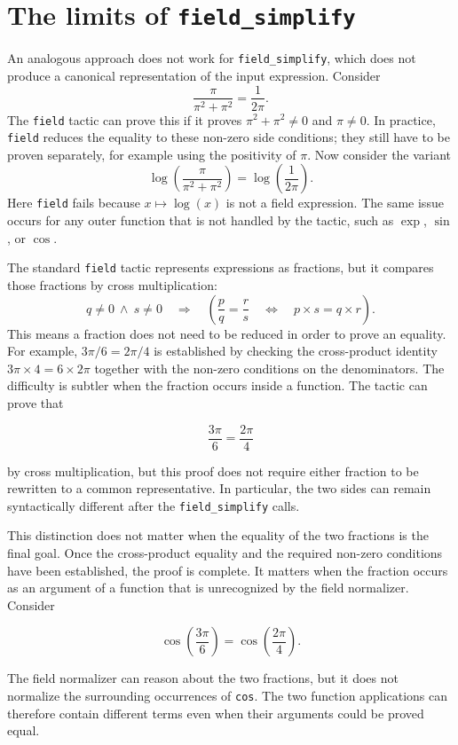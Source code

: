 \documentclass{jflart}
\begin{document}
\section{The limits of \texttt{field\_simplify}}
An analogous approach does not work for \texttt{field\_simplify}, which does not produce a canonical representation of the input expression. 
Consider
\[
  \frac{\pi}{\pi^2+\pi^2}=\frac{1}{2\pi}.
\]
The \texttt{field} tactic can prove this if it proves $\pi^2+\pi^2\ne0$ and
$\pi\ne0$.
In practice, \texttt{field} reduces the equality to these non-zero side conditions; they still have to be proven separately, for example using the positivity of
$\pi$.
Now consider the variant
\[
  \log\!\left(\frac{\pi}{\pi^2+\pi^2}\right)
  = \log\!\left(\frac{1}{2\pi}\right).
\]
Here \texttt{field} fails because $x\mapsto\log(x)$ is not a field
expression. The same issue occurs for any outer function that is not handled by the tactic, such as $\exp$, $\sin$, or $\cos$.


The standard \texttt{field} tactic represents expressions as fractions, but it compares those fractions by cross multiplication:
\[
  q\ne0\ \land\ s\ne0
  \quad\Longrightarrow\quad
  \left(\frac{p}{q}=\frac{r}{s}
  \quad\Longleftrightarrow\quad
  p\times s=q\times r\right).
\]
This means a fraction does not need to be reduced in order to prove an equality.
For example, $3\pi/6=2\pi/4$ is established by checking the cross-product
identity $3\pi\times4=6\times2\pi$ together with the non-zero conditions on the
denominators.
The difficulty is subtler when the fraction occurs inside a function. The
tactic can prove that

$$
  \frac{3\pi}{6}=\frac{2\pi}{4}
$$

by cross multiplication, but this proof does not require either fraction to
be rewritten to a common representative. In particular, the two sides can
remain syntactically different after the \texttt{field\_simplify} calls.

This distinction does not matter when the equality of the two fractions is
the final goal. Once the cross-product equality and the required non-zero
conditions have been established, the proof is complete. It matters when the
fraction occurs as an argument of a function that is unrecognized by the field
normalizer. Consider

$$
  \cos\left(\frac{3\pi}{6}\right)
  =
  \cos\left(\frac{2\pi}{4}\right).
$$

The field normalizer can reason about the two fractions, but it does not
normalize the surrounding occurrences of \texttt{cos}. The two function
applications can therefore contain different terms even when their
arguments could be proved equal.
\end{document}
